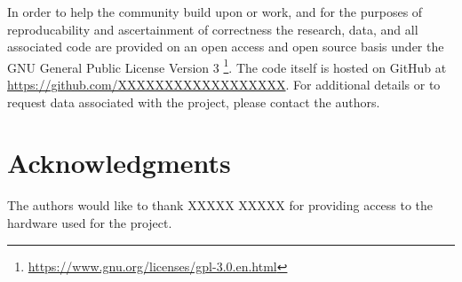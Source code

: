 \documentclass[conference]{IEEEtran}
\begin{document}
In order to help the community build upon or work, and for the
purposes of reproducability and ascertainment of correctness the
research, data, and all associated code are provided on an open access
and open source basis under the GNU General Public License Version 3
\footnote{\url{https://www.gnu.org/licenses/gpl-3.0.en.html}}.
The code itself is hosted on GitHub at \url{https://github.com/XXXXXXXXXXXXXXXXXX}.
For additional details or to request data associated with the project, please
contact the authors.



\section*{Acknowledgments}

The authors would like to thank XXXXX XXXXX for providing access to
the hardware used for the
project.














\end{document}
